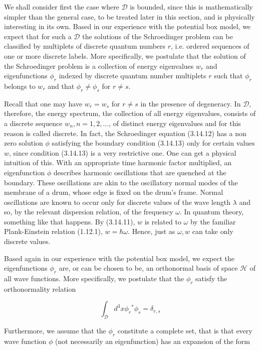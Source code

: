 \documentclass{article}
\begin{document}
We shall consider first the case where $\mathcal{D}$ is bounded, since this is mathematically simpler than the general case, to be treated later in this section, and is physically interesting in its own. Based in our experience with the potential box model, we expect that for such a $\mathcal{D}$ the solutions of the Schroedinger problem can be classified by multiplets of discrete quantum numbers $r$, i.e. ordered sequences of one or more discrete labels. More specifically, we postulate that
the solution of the Schroedinger problem is a collection of energy eigenvalues $w_{r}$ and eigenfunctions $\phi_{r}$ indexed by discrete quantum number multiplets $r$ such that $\phi_{r}$ belongs to $w_{r}$ and that $\phi_{r} \neq \phi_{s}$ for $r \neq s$.

Recall that one may have $w_{r}=w_{s}$ for $r \neq s$ in the presence of degeneracy.
In $\mathcal{D}$, therefore, the energy spectrum, the collection of all energy eigenvalues, consists of a discrete sequence $w_{n}, n=1,2, \ldots$, of distinct energy eigenvalues and for this reason is called discrete. In fact, the Schroedinger equation (3.14.12) has
a non zero solution $\phi$ satisfying the boundary condition (3.14.13) only for certain values $w$, since condition (3.14.13) is a very restrictive one. One can get a physical intuition of this. With an appropriate time harmonic factor multiplied, an eigenfunction $\phi$ describes harmonic oscillations that are quenched at the boundary. These oscillations are akin to the oscillatory normal modes of the membrane of a drum, whose edge is fixed on the drum's frame. Normal oscillations are known to occur only for discrete values of the wave length $\lambda$ and so, by the relevant dispersion relation, of the frequency $\omega$. In quantum theory, something like that happens. By (3.14.11), $w$ is related to $\omega$ by the familiar Plank-Einstein relation (1.12.1), $w=\hbar \omega$. Hence, just as $\omega, w$ can take only discrete values.

Based again in our experience with the potential box model, we expect the eigenfunctions $\phi_{r}$ are, or can be chosen to be, an orthonormal basis of space $\mathcal{H}$ of all wave functions. More specifically, we postulate that the $\phi_{r}$ satisfy the orthonormality relation
 
\begin{equation*}
\int_{\mathcal{D}} d^{3} x \phi_{r}{ }^{*} \phi_{s}=\delta_{r, s} \tag{3.17.1}
\end{equation*}
 

Furthermore, we assume that the $\phi_{r}$ constitute a complete set, that is that every wave function $\phi$ (not necessarily an eigenfunction) has an expansion of the form
 
\end{document}
